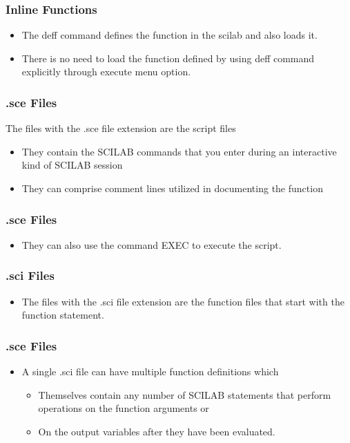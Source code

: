 \documentclass[17pt]{beamer}
\begin{document}
\begin{frame}[fragile]
\frametitle{Inline Functions}
\begin{itemize}
\item<+-|alert@+> The deff command defines the function in the scilab and also loads it.
\item<+-|alert@+> There is no need to load the function defined by using deff command explicitly through execute menu option.
\end{itemize}
\end{frame}

\begin{frame}
\frametitle{.sce Files}
The files with the .sce file extension are the script files
\begin{itemize}
\item<+-|alert@+> They contain the SCILAB commands that you enter during an interactive kind of SCILAB session
\item<+-|alert@+> They can comprise comment lines utilized in documenting the function
\end{itemize}
\end{frame}

\begin{frame}
\frametitle{.sce Files}
\begin{itemize}
\item<+-|alert@+> They can also use the command EXEC to execute the script.
\end{itemize}
\end{frame}

\begin{frame}
\frametitle{.sci Files}
\begin{itemize}
\item<+-|alert@+> The files with the .sci file extension are the function files that start with the function statement.
\end{itemize}
\end{frame}

\begin{frame}
\frametitle{.sce Files}
\begin{itemize}
\item<+-|alert@+> A single .sci file can have multiple function definitions which
\begin{itemize}
\item<+-|alert@+> Themselves contain any number of SCILAB statements that perform operations on the function arguments or
\item<+-|alert@+> On the output variables after they have been evaluated.
\end{itemize}
\end{itemize}
\end{frame}
\end{document}
